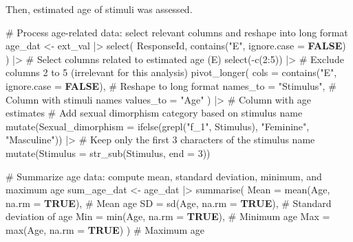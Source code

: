 \documentclass[
  bookmarksnumbered]{article}
\newenvironment{Shaded}{\begin{snugshade}}{\end{snugshade}}
\newcommand{\AttributeTok}[1]{\textcolor[rgb]{0.80,0.80,0.80}{#1}}
\newcommand{\CommentTok}[1]{\textcolor[rgb]{0.50,0.62,0.50}{#1}}
\newcommand{\ConstantTok}[1]{\textcolor[rgb]{0.86,0.64,0.64}{\textbf{#1}}}
\newcommand{\DecValTok}[1]{\textcolor[rgb]{0.86,0.86,0.80}{#1}}
\newcommand{\FunctionTok}[1]{\textcolor[rgb]{0.94,0.94,0.56}{#1}}
\newcommand{\NormalTok}[1]{\textcolor[rgb]{0.80,0.80,0.80}{#1}}
\newcommand{\OtherTok}[1]{\textcolor[rgb]{0.94,0.94,0.56}{#1}}
\newcommand{\SpecialCharTok}[1]{\textcolor[rgb]{0.86,0.64,0.64}{#1}}
\newcommand{\StringTok}[1]{\textcolor[rgb]{0.80,0.58,0.58}{#1}}
\begin{document}
Then, estimated age of stimuli was assessed.

\begin{Shaded}
\begin{Highlighting}[]
\CommentTok{\# Process age{-}related data: select relevant columns and reshape into long format}
\NormalTok{age\_dat }\OtherTok{\textless{}{-}}\NormalTok{ ext\_val }\SpecialCharTok{|\textgreater{}}
  \FunctionTok{select}\NormalTok{(}
\NormalTok{    ResponseId,}
    \FunctionTok{contains}\NormalTok{(}\StringTok{"E"}\NormalTok{, }\AttributeTok{ignore.case =} \ConstantTok{FALSE}\NormalTok{)}
\NormalTok{  ) }\SpecialCharTok{|\textgreater{}} \CommentTok{\# Select columns related to estimated age (E)}
  \FunctionTok{select}\NormalTok{(}\SpecialCharTok{{-}}\FunctionTok{c}\NormalTok{(}\DecValTok{2}\SpecialCharTok{:}\DecValTok{5}\NormalTok{)) }\SpecialCharTok{|\textgreater{}} \CommentTok{\# Exclude columns 2 to 5 (irrelevant for this analysis)}
  \FunctionTok{pivot\_longer}\NormalTok{(}
    \AttributeTok{cols =} \FunctionTok{contains}\NormalTok{(}\StringTok{"E"}\NormalTok{, }\AttributeTok{ignore.case =} \ConstantTok{FALSE}\NormalTok{), }\CommentTok{\# Reshape to long format}
    \AttributeTok{names\_to =} \StringTok{"Stimulus"}\NormalTok{, }\CommentTok{\# Column with stimuli names}
    \AttributeTok{values\_to =} \StringTok{"Age"}
\NormalTok{  ) }\SpecialCharTok{|\textgreater{}} \CommentTok{\# Column with age estimates}
  \CommentTok{\# Add sexual dimorphism category based on stimulus name}
  \FunctionTok{mutate}\NormalTok{(}\AttributeTok{Sexual\_dimorphism =} \FunctionTok{ifelse}\NormalTok{(}\FunctionTok{grepl}\NormalTok{(}\StringTok{"f\_1"}\NormalTok{, Stimulus), }\StringTok{"Feminine"}\NormalTok{, }\StringTok{"Masculine"}\NormalTok{)) }\SpecialCharTok{|\textgreater{}}
  \CommentTok{\# Keep only the first 3 characters of the stimulus name}
  \FunctionTok{mutate}\NormalTok{(}\AttributeTok{Stimulus =} \FunctionTok{str\_sub}\NormalTok{(Stimulus, }\AttributeTok{end =} \DecValTok{3}\NormalTok{))}

\CommentTok{\# Summarize age data: compute mean, standard deviation, minimum, and maximum age}
\NormalTok{sum\_age\_dat }\OtherTok{\textless{}{-}}\NormalTok{ age\_dat }\SpecialCharTok{|\textgreater{}}
  \FunctionTok{summarise}\NormalTok{(}
    \AttributeTok{Mean =} \FunctionTok{mean}\NormalTok{(Age, }\AttributeTok{na.rm =} \ConstantTok{TRUE}\NormalTok{), }\CommentTok{\# Mean age}
    \AttributeTok{SD =} \FunctionTok{sd}\NormalTok{(Age, }\AttributeTok{na.rm =} \ConstantTok{TRUE}\NormalTok{), }\CommentTok{\# Standard deviation of age}
    \AttributeTok{Min =} \FunctionTok{min}\NormalTok{(Age, }\AttributeTok{na.rm =} \ConstantTok{TRUE}\NormalTok{), }\CommentTok{\# Minimum age}
    \AttributeTok{Max =} \FunctionTok{max}\NormalTok{(Age, }\AttributeTok{na.rm =} \ConstantTok{TRUE}\NormalTok{)}
\NormalTok{  ) }\CommentTok{\# Maximum age}
\end{Highlighting}
\end{Shaded}
\end{document}
